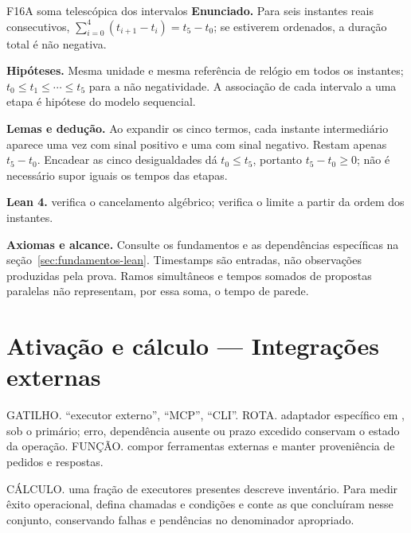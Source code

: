 \begin{formalizacao}{F16}{A soma telescópica dos intervalos}
\textbf{Enunciado.} Para seis instantes reais consecutivos,
$\sum_{i=0}^{4}(t_{i+1}-t_i)=t_5-t_0$; se estiverem ordenados, a duração
total é não negativa.

\textbf{Hipóteses.} Mesma unidade e mesma referência de relógio em todos
os instantes; $t_0\leq t_1\leq\cdots\leq t_5$ para a não negatividade.
A associação de cada intervalo a uma etapa é hipótese do modelo sequencial.

\textbf{Lemas e dedução.} Ao expandir os cinco termos, cada instante
intermediário aparece uma vez com sinal positivo e uma com sinal negativo.
Restam apenas $t_5-t_0$. Encadear as cinco desigualdades dá $t_0\leq t_5$,
portanto $t_5-t_0\geq0$; não é necessário supor iguais os tempos das etapas.

\textbf{Lean 4.} 
verifica o cancelamento algébrico;
 verifica o
limite a partir da ordem dos instantes.

\textbf{Axiomas e alcance.} Consulte os fundamentos e as dependências
específicas na seção~\ref{sec:fundamentos-lean}. Timestamps são entradas,
não observações produzidas pela prova. Ramos simultâneos e tempos somados
de propostas paralelas não representam, por essa soma, o tempo de parede.
\end{formalizacao}

\section[Ativação e cálculo]{Ativação e cálculo — Integrações externas}

\begin{processo}
GATILHO. ``executor externo'', ``MCP'', ``CLI''.
ROTA. adaptador específico em , sob o primário; erro,
dependência ausente ou prazo excedido conservam o estado da operação.
FUNÇÃO. compor ferramentas externas e manter proveniência de pedidos e respostas.
\end{processo}

\begin{resultado}
CÁLCULO. uma fração de executores presentes descreve inventário. Para medir
êxito operacional, defina chamadas e condições e conte as que concluíram nesse
conjunto, conservando falhas e pendências no denominador apropriado.
\end{resultado}

